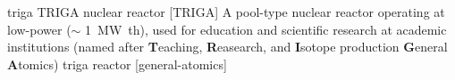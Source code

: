 \newglsXequipment%
{triga}%
{TRIGA nuclear reactor}%
[TRIGA]%
{A pool-type nuclear reactor operating at low-power ($\sim$ \SI{1}{\mega\watt th}), used for education and scientific research at academic institutions (named after \textbf{T}eaching, \textbf{R}easearch, and \textbf{I}sotope production \textbf{G}eneral \textbf{A}tomics)}%
{triga reactor}%
[general-atomics]%